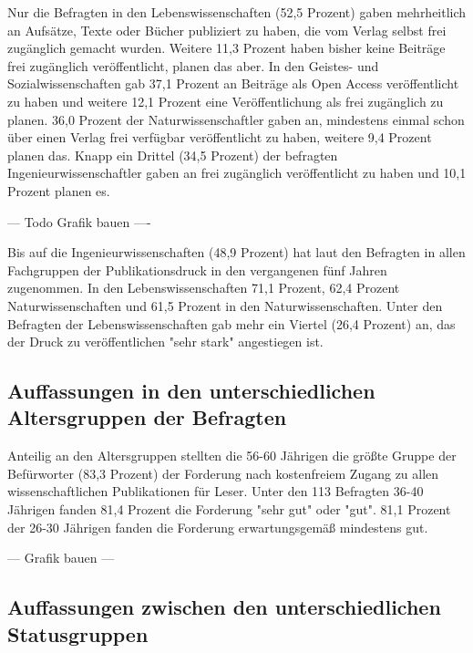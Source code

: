 Nur die Befragten in den Lebenswissenschaften (52,5 Prozent) gaben mehrheitlich an Aufsätze, Texte oder Bücher publiziert zu haben, die vom Verlag selbst frei zugänglich gemacht wurden. Weitere 11,3 Prozent haben bisher keine Beiträge frei zugänglich veröffentlicht, planen das aber. In den Geistes- und Sozialwissenschaften gab 37,1 Prozent an Beiträge als Open Access veröffentlicht zu haben und weitere 12,1 Prozent eine Veröffentlichung als frei zugänglich zu planen. 36,0 Prozent der Naturwissenschaftler gaben an, mindestens einmal schon über einen Verlag frei verfügbar veröffentlicht zu haben, weitere 9,4 Prozent planen das. Knapp ein Drittel (34,5 Prozent) der befragten Ingenieurwissenschaftler gaben an frei zugänglich veröffentlicht zu haben und 10,1 Prozent planen es.

--- Todo Grafik bauen ----

Bis auf die Ingenieurwissenschaften (48,9 Prozent) hat laut den Befragten in allen Fachgruppen der Publikationsdruck in den vergangenen fünf Jahren zugenommen. In den Lebenswissenschaften 71,1 Prozent, 62,4 Prozent Naturwissenschaften und 61,5 Prozent in den Naturwissenschaften. Unter den Befragten der Lebenswissenschaften gab mehr ein Viertel (26,4 Prozent) an, das der Druck zu veröffentlichen "sehr stark" angestiegen ist.

\subsection{Auffassungen in den unterschiedlichen Altersgruppen der Befragten}

Anteilig an den Altersgruppen stellten die 56-60 Jährigen die größte Gruppe der Befürworter (83,3 Prozent) der Forderung nach kostenfreiem Zugang zu allen wissenschaftlichen Publikationen für Leser. Unter den 113 Befragten 36-40 Jährigen fanden 81,4 Prozent die Forderung "sehr gut" oder "gut". 81,1 Prozent der 26-30 Jährigen fanden die Forderung erwartungsgemäß mindestens gut.

--- Grafik bauen ---

\subsection{Auffassungen zwischen den unterschiedlichen Statusgruppen}

